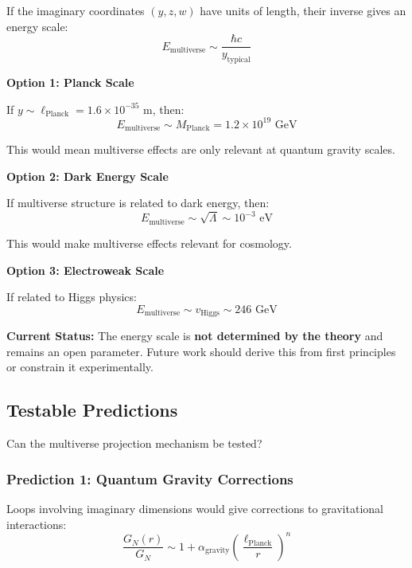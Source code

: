 If the imaginary coordinates $(y, z, w)$ have units of length, their inverse gives an energy scale:
\begin{equation}
E_{\text{multiverse}} \sim \frac{\hbar c}{y_{\text{typical}}}
\end{equation}

\textbf{Option 1: Planck Scale}

If $y \sim \ell_{\text{Planck}} = 1.6 \times 10^{-35}$ m, then:
\begin{equation}
E_{\text{multiverse}} \sim M_{\text{Planck}} = 1.2 \times 10^{19} \text{ GeV}
\end{equation}

This would mean multiverse effects are only relevant at quantum gravity scales.

\textbf{Option 2: Dark Energy Scale}

If multiverse structure is related to dark energy, then:
\begin{equation}
E_{\text{multiverse}} \sim \sqrt{\Lambda} \sim 10^{-3} \text{ eV}
\end{equation}

This would make multiverse effects relevant for cosmology.

\textbf{Option 3: Electroweak Scale}

If related to Higgs physics:
\begin{equation}
E_{\text{multiverse}} \sim v_{\text{Higgs}} \sim 246 \text{ GeV}
\end{equation}

\textbf{Current Status:} The energy scale is \textbf{not determined by the theory} and remains an open parameter. Future work should derive this from first principles or constrain it experimentally.

\subsection{Testable Predictions}

Can the multiverse projection mechanism be tested?

\subsubsection{Prediction 1: Quantum Gravity Corrections}

Loops involving imaginary dimensions would give corrections to gravitational interactions:
\begin{equation}
\frac{G_N(r)}{G_N} \sim 1 + \alpha_{\text{gravity}} \left(\frac{\ell_{\text{Planck}}}{r}\right)^n
\end{equation}

